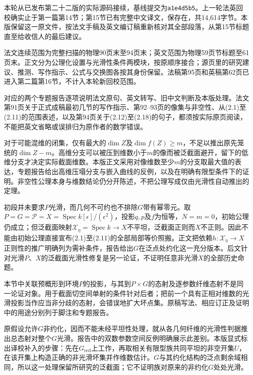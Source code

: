 本轮从已发布第二十二版的实际源码接续，基线提交为\texttt{a1e4d5b5}。上一轮法英回校确实止于第一篇第14节；第15节已有完整中文译文，保存在，共14,614字节。本版保留这一原文件，按法文手稿及英文编订稿重新核对其全部段落，从第15节标题直至给收信人的最后建议。

法文连续范围为完整扫描的物理90页末至94页末；英文范围为物理59页节标题至61页末。正文分为公理化设置与光滑性条件两模块，按原顺序接合；源页里的研究建议、推测、写作指示、公式与交换图各按其身份保留。法稿第95页和英稿第62页已进入第二篇第16节，不计入本轮新回校范围。

对应的两个专题报告逐项说明法文原句、英文转写、旧中文判断及本版处理。法文第91页关于正式成稿最初几节的写作指示、第92--93页的像集与非空性、从(2.1)至(2.11)的范围表述，以及第94页关于(2.12)至(2.18)的句子，都须按实际原页阅读，不能把英文省略或误排归为原作者的数学错误。

对于可能混维的闭集，仅有最大的$\dim Z$及$\dim f(Z)\ge m$，不足以推出原先笼统的$\dim Z-m$。高维分支可以被压到维数小于$m$的像而被泛截面避开，留下的低维分支才决定实际截面维数。本版正文采用对像维数至少$m$的分支取最大值的表达，专题报告给出高维压塌分支与嵌入曲线的反例，以及在明确有限型条件下的证明。非空性公理本身与维数结论仍分开陈述，不把公理写成仅由光滑性自动推出的定理。

初段并未要求$P$光滑，而几何不可约也不排除$G$带有幂零元。取$P=G=\mathcal P=X=\operatorname{Spec}k[\epsilon]/(\epsilon^2)$，投影$q,p$及$f$为恒等，$N=m=0$，初始公理仍成立；但泛截面映射$\mathcal X_\eta=\operatorname{Spec}k\to X$不平坦，泛截面正则而$X$不正则。因此不能由初始公理直接宣布(2.1)至(2.11)的全部局部等价照搬。正文把依赖$h\colon\mathcal X_\eta\to X$正则性的推广明确列为需补条件，报告给出$G$在泛点处约化这一充分版本。后文针对光滑$P$、$X$的泛截面光滑性修复是另一论证，不证明任意非光滑$X$的全部历史命题。

本节中关联预概形到环境$P$的投影，与其到$P\times G$的态射及逐参数纤维态射不是同一论证对象。用于截面切空间单射的条件针对后者；把前一个具有正相对维数的光滑投影当作应当非分歧的态射，会错误地扩大坏点集。原稿写法、相应订正及证明中的用途分别列于脚注和专题报告。

原假设允许$G$非约化，因而不能未经平坦性处理，就从各几何纤维的光滑性判据推出总态射对整个$G$光滑。报告中的双数参数空间反例明确展示此差别。本版显式标出译校补入的步骤：先在$G_{\mathrm{red}}$上工作，再取相关有限型族共同平坦的非空开集$U$，在该开集上构造正确的非光滑坏集并作维数估计。$G$与其约化结构的泛点剩余域相同，所以这一处理保留所研究的泛截面；它不证明族对原来的非约化$G$处处光滑。

